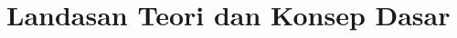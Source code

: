 \documentclass[../../main.tex]{subfiles}
\begin{document}
\chapter{Landasan Teori dan Konsep Dasar}
\label{chap:landasan-teori}






















\ifSubfilesClassLoaded{%
  \clearpage
}{}
\end{document}
